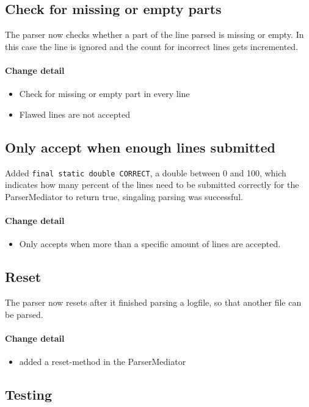 \subsection{Check for missing or empty parts}
The parser now checks whether a part of the line parsed is missing or empty. In this case the line is ignored and 
the count for incorrect lines gets incremented.

\paragraph{Change detail}
\begin{itemize}
  \item Check for missing or empty part in every line
  \item Flawed lines are not accepted
\end{itemize}

\subsection{Only accept when enough lines submitted}
Added \texttt{final static double CORRECT}, a double between 0 and 100, which indicates how many percent of the lines need to be
submitted correctly for the ParserMediator to return true, singaling parsing was successful.

\paragraph{Change detail}
\begin{itemize}
  \item Only accepts when more than a specific amount of lines are accepted.
\end{itemize}

\subsection{Reset}
The parser now resets after it finished parsing a logfile, so that another file can be parsed.

\paragraph{Change detail}
\begin{itemize}
  \item added a reset-method in the ParserMediator
\end{itemize}


\subsection{Testing}

